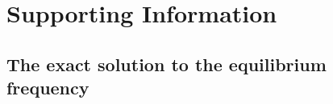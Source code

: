 \documentclass{article}
\newif\ifsubmissionversion
\begin{document}



\ifsubmissionversion
\clearpage
\renewcommand*\listfigurename{Figure Legends}
\listoffigures
\fi

\clearpage

\ifsubmissionversion
  \renewcommand{\thesfigure}{S\arabic{sfigure}}
  \renewcommand{\thepostsfigure}{S\arabic{postsfigure}}
  \renewcommand{\thetable}{S\arabic{table}}
  \renewcommand{\theposttable}{S\arabic{posttable}}
  \setcounter{posttable}{0}
\fi

\ifsubmissionversion
  \renewcommand*\listsfigurename{Supplementary Figure Legends}
  \listofsfigures
  \renewcommand*\listtablename{Supplementary Table Legends}
  \listoftables
  \pagebreak
\fi

\appendix
\section*{Supporting Information}

\setcounter{secnumdepth}{2}

\subsection*{The exact solution to the equilibrium frequency}
\label{apx:elliptic_integrals}
\end{document}
